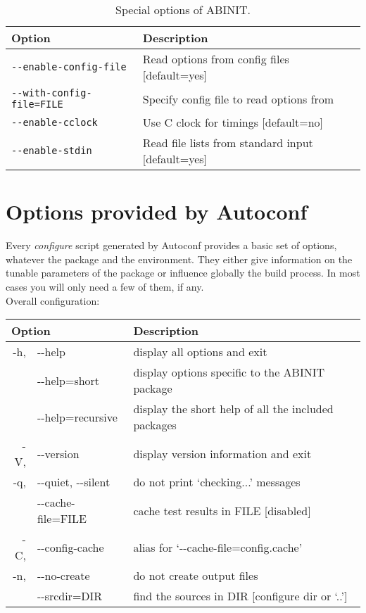 \begin{table}
\begin{center}
\begin{tabular}{|l|l|}
\hline
\textbf{Option} & \textbf{Description} \\
\hline
\texttt{-{-}enable-config-file}    & Read options from config files [default=yes] \\
\texttt{-{-}with-config-file=FILE} & Specify config file to read options from \\
\hline
\texttt{-{-}enable-cclock}         & Use C clock for timings [default=no] \\
\hline
\texttt{-{-}enable-stdin}          & Read file lists from standard input
                                   [default=yes] \\
\hline
\end{tabular}
\end{center}
\caption{Special options of ABINIT.}
\label{tab:opt-special}
\end{table}

\section{Options provided by Autoconf}

Every \textit{configure} script generated by Autoconf provides a basic
set of options, whatever the package and the environment. They either
give information on the tunable parameters of the package or influence
globally the build process. In most cases you will only need a few of
them, if any.
\\

Overall configuration:

\begin{center}
\begin{tabular}{|r l|l|}
\hline
\multicolumn{2}{|l|}{\textbf{Option}} & \textbf{Description} \\
\hline
-h, & -{-}help            & display all options and exit \\
    & -{-}help=short      & display options specific to the ABINIT package \\
    & -{-}help=recursive  & display the short help of all the included
                          packages \\
-V, & -{-}version         & display version information and exit \\
-q, & -{-}quiet, -{-}silent & do not print `checking...' messages \\
    & -{-}cache-file=FILE & cache test results in FILE [disabled] \\
-C, & -{-}config-cache    & alias for `-{-}cache-file=config.cache' \\
-n, & -{-}no-create       & do not create output files \\
    & -{-}srcdir=DIR      & find the sources in DIR [configure dir or `..'] \\
\hline
\end{tabular}
\end{center}

